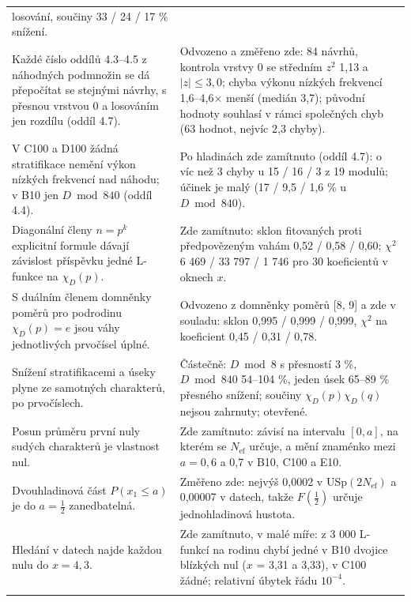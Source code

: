 \documentclass[
  10pt,
]{article}
\begin{document}
{\begin{longtable}[]{@{}
  >{\raggedright\arraybackslash}p{}
  >{\raggedright\arraybackslash}p{}@{}}
losování, součiny 33 / 24 / 17 \% snížení. \\ \addlinespace[2pt]
Každé číslo oddílů 4.3--4.5 z náhodných podmnožin se dá přepočítat se
stejnými návrhy, s přesnou vrstvou 0 a losováním jen rozdílu (oddíl
4.7). & Odvozeno a změřeno zde: 84 návrhů, kontrola vrstvy 0 se středním
\(z^2\) 1,13 a \(|z| \le 3{,}0\); chyba výkonu nízkých frekvencí
1,6--4,6× menší (medián 3,7); původní hodnoty souhlasí v rámci
společných chyb (63 hodnot, nejvíc 2,3 chyby). \\ \addlinespace[2pt]
V C100 a D100 žádná stratifikace nemění výkon nízkých frekvencí nad
náhodu; v B10 jen \(D \bmod 840\) (oddíl 4.4). & Po hladinách zde
zamítnuto (oddíl 4.7): o víc než 3 chyby u 15 / 16 / 3 z 19 modulů;
účinek je malý (17 / 9,5 / 1,6 \% u \(D \bmod 840\)). \\ \addlinespace[2pt]
Diagonální členy \(n = p^k\) explicitní formule dávají závislost
příspěvku jedné L-funkce na \(\chi_D(p)\). & Zde zamítnuto: sklon
fitovaných proti předpovězeným vahám 0,52 / 0,58 / 0,60; \(\chi^2\) 6
469 / 33 797 / 1 746 pro 30 koeficientů v oknech \(x\). \\ \addlinespace[2pt]
S duálním členem domněnky poměrů pro podrodinu \(\chi_D(p) = e\) jsou
váhy jednotlivých prvočísel úplné. & Odvozeno z domněnky poměrů {[}8,
9{]} a zde v souladu: sklon 0,995 / 0,999 / 0,999, \(\chi^2\) na
koeficient 0,45 / 0,31 / 0,78. \\ \addlinespace[2pt]
Snížení stratifikacemi a úseky plyne ze samotných charakterů, po
prvočíslech. & Částečně: \(D \bmod 8\) s přesností 3 \%, \(D \bmod 840\)
54--104 \%, jeden úsek 65--89 \% přesného snížení; součiny
\(\chi_D(p)\chi_D(q)\) nejsou zahrnuty; otevřené. \\ \addlinespace[2pt]
Posun průměru první nuly sudých charakterů je vlastnost nul. & Zde
zamítnuto: závisí na intervalu \([0, a]\), na kterém se
\(N_{\mathrm{ef}}\) určuje, a mění znaménko mezi \(a = 0{,}6\) a 0,7 v
B10, C100 a E10. \\ \addlinespace[2pt]
Dvouhladinová část \(P(x_1 \le a)\) je do \(a = \frac12\) zanedbatelná.
& Změřeno zde: nejvýš 0,0002 v USp\((2N_{\mathrm{ef}})\) a 0,00007 v
datech, takže \(F(\frac12)\) určuje jednohladinová hustota. \\ \addlinespace[2pt]
Hledání v datech najde každou nulu do \(x = 4{,}3\). & Zde zamítnuto, v
malé míře: z 3 000 L-funkcí na rodinu chybí jedné v B10 dvojice blízkých
nul (\(x\) = 3,31 a 3,33), v C100 žádné; relativní úbytek řádu
\(10^{-4}\). \\ \addlinespace[2pt]

\end{longtable}}
\end{document}
